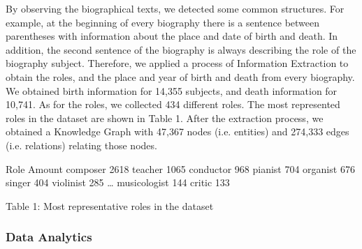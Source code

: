 
By observing the biographical texts, we detected some common structures. For example, at the beginning of every biography there is a sentence between parentheses with information about the place and date of birth and death. In addition, the second sentence of the biography is always describing the role of the biography subject. Therefore, we applied a process of Information Extraction to obtain the roles, and the place and year of birth and death from every biography. We obtained birth information for 14,355 subjects, and death information for 10,741. As for the roles, we collected 434 different roles. The most represented roles in the dataset are shown in Table 1. After the extraction process, we obtained a Knowledge Graph with 47,367 nodes (i.e. entities) and 274,333 edges (i.e. relations) relating those nodes. %

Role	Amount
composer	2618
teacher	1065
conductor	968
pianist	704
organist	676
singer	404
violinist	285
…	
musicologist	144
critic	133

Table 1: Most representative roles in the dataset


\subsubsection{Data Analytics}

